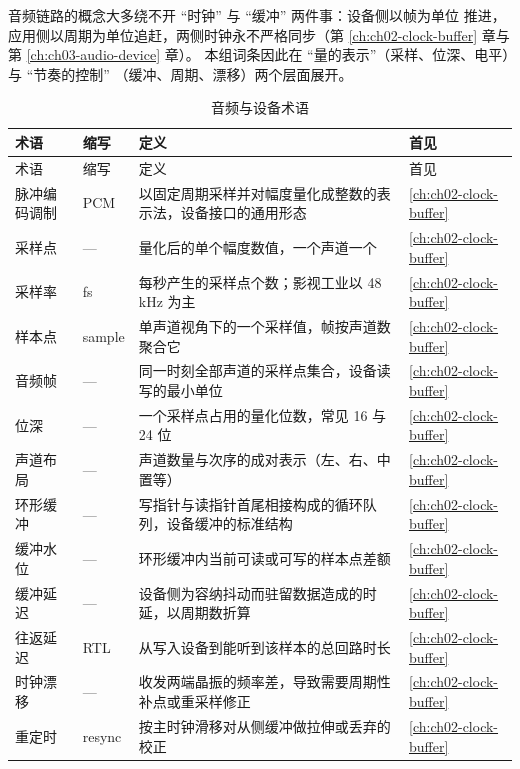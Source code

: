 \documentclass[12pt,a4paper,fontset=fandol]{ctexbook}
\begin{document}
音频链路的概念大多绕不开 ``时钟'' 与 ``缓冲'' 两件事：设备侧以帧为单位
推进，应用侧以周期为单位追赶，两侧时钟永不严格同步（第
\ref{ch:ch02-clock-buffer} 章与第 \ref{ch:ch03-audio-device} 章）。
本组词条因此在 ``量的表示''（采样、位深、电平）与 ``节奏的控制''
（缓冲、周期、漂移）两个层面展开。

\begin{longtable}{>{\raggedright\arraybackslash}p{} >{\raggedright\arraybackslash}p{} >{\raggedright\arraybackslash}p{} >{\raggedright\arraybackslash}p{}}
\caption{音频与设备术语}\label{tab:apa-audio} \\
\toprule
术语 & 缩写 & 定义 & 首见 \\
\midrule
\endfirsthead
\toprule
术语 & 缩写 & 定义 & 首见 \\
\midrule
\endhead
\bottomrule
\endfoot
脉冲编码调制 & PCM & 以固定周期采样并对幅度量化成整数的表示法，设备接口的通用形态 & \ref{ch:ch02-clock-buffer} \\
采样点 & — & 量化后的单个幅度数值，一个声道一个 & \ref{ch:ch02-clock-buffer} \\
采样率 & fs & 每秒产生的采样点个数；影视工业以 48 kHz 为主 & \ref{ch:ch02-clock-buffer} \\
样本点 & sample & 单声道视角下的一个采样值，帧按声道数聚合它 & \ref{ch:ch02-clock-buffer} \\
音频帧 & — & 同一时刻全部声道的采样点集合，设备读写的最小单位 & \ref{ch:ch02-clock-buffer} \\
位深 & — & 一个采样点占用的量化位数，常见 16 与 24 位 & \ref{ch:ch02-clock-buffer} \\
声道布局 & — & 声道数量与次序的成对表示（左、右、中置等） & \ref{ch:ch02-clock-buffer} \\
环形缓冲 & — & 写指针与读指针首尾相接构成的循环队列，设备缓冲的标准结构 & \ref{ch:ch02-clock-buffer} \\
缓冲水位 & — & 环形缓冲内当前可读或可写的样本点差额 & \ref{ch:ch02-clock-buffer} \\
缓冲延迟 & — & 设备侧为容纳抖动而驻留数据造成的时延，以周期数折算 & \ref{ch:ch02-clock-buffer} \\
往返延迟 & RTL & 从写入设备到能听到该样本的总回路时长 & \ref{ch:ch02-clock-buffer} \\
时钟漂移 & — & 收发两端晶振的频率差，导致需要周期性补点或重采样修正 & \ref{ch:ch02-clock-buffer} \\
重定时 & resync & 按主时钟滑移对从侧缓冲做拉伸或丢弃的校正 & \ref{ch:ch02-clock-buffer} \\

\end{longtable}
\end{document}
